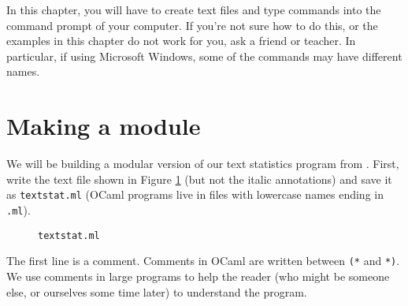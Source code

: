 \documentclass[]{book}
\begin{document}
In this chapter, you will have to create text files and type commands into the command prompt of your computer. If you're not sure how to do this, or the examples in this chapter do not work for you, ask a friend or teacher. In particular, if using Microsoft Windows, some of the commands may have different names.

\section*{Making a module}

We will be building a modular version of our text statistics program from . First, write the text file shown in Figure \ref{textstat.ml} (but not the italic annotations) and save it as \texttt{textstat.ml} (OCaml programs live in files with lowercase names ending in \texttt{.ml}).

\begin{figure}
\begin{center}
\end{center}
\caption{\small \texttt{textstat.ml}}
\label{textstat.ml}
\end{figure}

The first line is a comment. Comments in OCaml are written between \texttt{(*} and \texttt{*)}. We use comments in large programs to help the reader (who might be someone else, or ourselves some time later) to understand the program.
\end{document}
